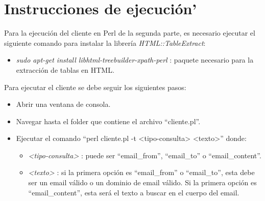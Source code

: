 \documentclass{article}
\let\<\textless
\let\>\textgreater
\begin{document}
\section{Instrucciones de ejecuci\'on'}
Para la ejecuci\'on del cliente en Perl de la segunda parte, es necesario ejecutar el siguiente comando para instalar la librer\'ia \emph{HTML::TableExtract}:
\begin{itemize}
  \item \emph{sudo apt-get install libhtml-treebuilder-xpath-perl} : paquete necesario para la extracci\'on de tablas en HTML.
\end{itemize}

Para ejecutar el cliente se debe seguir los siguientes pasos:
\begin{itemize}
  \item Abrir una ventana de consola.
  \item Navegar hasta el folder que contiene el archivo ``cliente.pl''.
  \item Ejecutar el comando ``perl cliente.pl -t \<tipo-consulta\> \<texto\>'' donde:
  \begin{itemize}
    \item \emph{\<tipo-consulta\>} : puede ser ``email\_from'', ``email\_to'' o ``email\_content''.
    \item \emph{\<texto\>} : si la primera opci\'on es ``email\_from'' o ``email\_to'', esta debe ser un email v\'alido o un dominio de email v\'alido. Si la primera opci\'on es ``email\_content'', esta ser\'a el texto a buscar en el cuerpo del email.
  \end{itemize}
\end{itemize}
\end{document}
